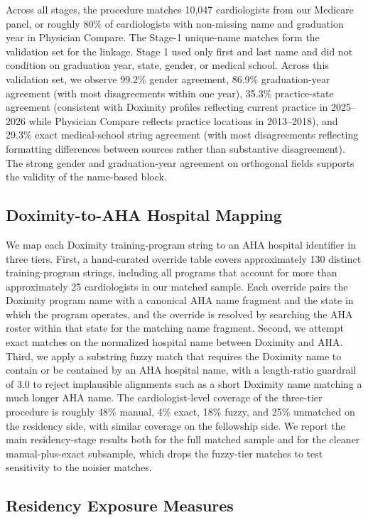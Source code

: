 \documentclass[12pt]{article}
\begin{document}
Across all stages, the procedure matches 10,047 cardiologists from our Medicare panel, or roughly 80\% of cardiologists with non-missing name and graduation year in Physician Compare. The Stage-1 unique-name matches form the validation set for the linkage. Stage 1 used only first and last name and did not condition on graduation year, state, gender, or medical school. Across this validation set, we observe 99.2\% gender agreement, 86.9\% graduation-year agreement (with most disagreements within one year), 35.3\% practice-state agreement (consistent with Doximity profiles reflecting current practice in 2025--2026 while Physician Compare reflects practice locations in 2013--2018), and 29.3\% exact medical-school string agreement (with most disagreements reflecting formatting differences between sources rather than substantive disagreement). The strong gender and graduation-year agreement on orthogonal fields supports the validity of the name-based block.

\subsection{Doximity-to-AHA Hospital Mapping}

We map each Doximity training-program string to an AHA hospital identifier in three tiers. First, a hand-curated override table covers approximately 130 distinct training-program strings, including all programs that account for more than approximately 25 cardiologists in our matched sample. Each override pairs the Doximity program name with a canonical AHA name fragment and the state in which the program operates, and the override is resolved by searching the AHA roster within that state for the matching name fragment. Second, we attempt exact matches on the normalized hospital name between Doximity and AHA. Third, we apply a substring fuzzy match that requires the Doximity name to contain or be contained by an AHA hospital name, with a length-ratio guardrail of 3.0 to reject implausible alignments such as a short Doximity name matching a much longer AHA name. The cardiologist-level coverage of the three-tier procedure is roughly 48\% manual, 4\% exact, 18\% fuzzy, and 25\% unmatched on the residency side, with similar coverage on the fellowship side. We report the main residency-stage results both for the full matched sample and for the cleaner manual-plus-exact subsample, which drops the fuzzy-tier matches to test sensitivity to the noisier matches.

\subsection{Residency Exposure Measures}
\end{document}
